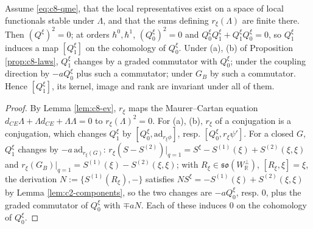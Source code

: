 \begin{theorem}
\label{thm:c8-twist}
Assume \eqref{eq:c8-qme}, that the local representatives exist on a space of local functionals stable under $\Lambda$, and that the sums defining $r_\xi(\Lambda)$ are finite there. Then $(Q^\xi)^2=0$; at orders $\hbar^0,\hbar^1$, $(Q^\xi_0)^2=0$ and $Q^\xi_0Q^\xi_1+Q^\xi_1Q^\xi_0=0$, so $Q^\xi_1$ induces a map $[Q^\xi_1]$ on the cohomology of $Q^\xi_0$. Under (a), (b) of Proposition \ref{prop:c8-laws}, $Q^\xi_1$ changes by a graded commutator with $Q^\xi_0$; under the coupling direction by $-aQ^\xi_0$ plus such a commutator; under $G_B$ by such a commutator. Hence $[Q^\xi_1]$, its kernel, image and rank are invariant under all of them.
\end{theorem}

\begin{proof}
By Lemma \ref{lem:c8-ev}, $r_\xi$ maps the Maurer--Cartan equation $d_{CE}\Lambda+\Lambda d_{CE}+\Lambda\Lambda=0$ to $r_\xi(\Lambda)^2=0$. For (a), (b), $r_\xi$ of a conjugation is a conjugation, which changes $Q^\xi_1$ by $[Q^\xi_0,\mathrm{ad}_{r_\xi\phi}]$, resp. $[Q^\xi_0,r_\xi\psi']$. For a closed $G$, $Q^\xi_1$ changes by $-a\,\mathrm{ad}_{r_\xi(G)}$: $r_\xi(S-S^{(2)})|_{q=1}=S^\xi-S^{(1)}(\xi)+S^{(2)}(\xi,\xi)$ and $r_\xi(G_B)|_{q=1}=S^{(1)}(\xi)-S^{(2)}(\xi,\xi)$; with $R_\xi\in\mathfrak{so}(W_{\mathbb R}^\perp)$, $[R_\xi,\xi]=\xi$, the derivation $N:=\{S^{(1)}(R_\xi),-\}$ satisfies $NS^\xi=-S^{(1)}(\xi)+S^{(2)}(\xi,\xi)$ by Lemma \ref{lem:c2-components}, so the two changes are $-aQ^\xi_0$, resp. $0$, plus the graded commutator of $Q^\xi_0$ with $\mp aN$. Each of these induces $0$ on the cohomology of $Q^\xi_0$.
\end{proof}


